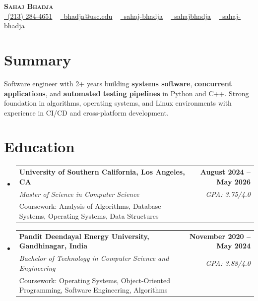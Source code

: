\documentclass[letterpaper,10pt]{article}
\makeatletter
\newcommand{\resumeEduSubheading}[5]{\vspace{-1pt}\item\begin{tabular*}{1.0\textwidth}[t]{l@{\extracolsep{\fill}}r}\textbf{#1} & \textbf{\small #2} \\\textit{\small #3} & \textit{\small #4} \\\small #5 & \\\end{tabular*}\vspace{-4pt}}
\newcommand{\resumeSubHeadingListStart}{\begin{itemize}[leftmargin=0.0in, label={}]}
\newcommand{\resumeSubHeadingListEnd}{\end{itemize}}
\makeatother
\begin{document}
\begin{center}
{\Huge \scshape \textbf{Sahaj Bhadja}} \\ \vspace{1pt}
\small \href{tel:(213) 284-4651}{\faPhone\ \underline{(213) 284-4651}} ~ \href{mailto:bhadja@usc.edu}{\raisebox{-0.2\height}\faEnvelope\ \underline{bhadja@usc.edu}} ~
\href{https://www.linkedin.com/in/sahaj-bhadja/}{\raisebox{-0.2\height}\faLinkedin\ \underline{sahaj-bhadja}} ~ \href{https://github.com/SAHAJ-BHADJA}{\raisebox{-0.2\height}\faGithub\ \underline{sahajbhadja}} ~
\href{https://sahaj-bhadja.vercel.app/}{\raisebox{-0.2\height}\faGlobe\ \underline{sahaj-bhadja}}
\end{center}
\vspace{-18pt}
\section{Summary}
\begin{itemize}[leftmargin=0.15in, label={}]
\small{\item{Software engineer with 2+ years building \textbf{systems software}, \textbf{concurrent applications}, and \textbf{automated testing pipelines} in Python and C++. Strong foundation in algorithms, operating systems, and Linux environments with experience in CI/CD and cross-platform development.}}
\end{itemize}
\vspace{-16pt}
\section{Education}
\resumeSubHeadingListStart
\resumeEduSubheading{University of Southern California, Los Angeles, CA}{August 2024 -- May 2026}{Master of Science in Computer Science}{GPA: 3.75/4.0}{Coursework: Analysis of Algorithms, Database Systems, Operating Systems, Data Structures}
\vspace{-9pt}
\resumeEduSubheading{Pandit Deendayal Energy University, Gandhinagar, India}{November 2020 -- May 2024}{Bachelor of Technology in Computer Science and Engineering}{GPA: 3.88/4.0}{Coursework: Operating Systems, Object-Oriented Programming, Software Engineering, Algorithms}
\resumeSubHeadingListEnd
\vspace{-14pt}
\end{document}
